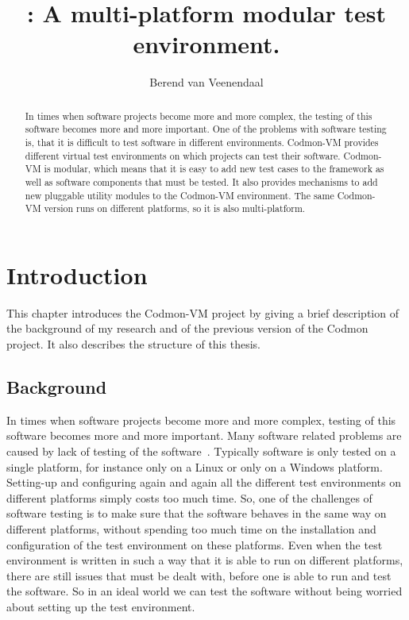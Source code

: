\documentclass{article}
\title{\project{}: A multi-platform modular test environment.}
\author{Berend van Veenendaal}
\newcommand{\project}{Codmon-VM}
\begin{document}
\maketitle

\begin{abstract}
In times when software projects become more and more complex, the testing of this software becomes more and more important. One of the problems with software testing is, that it is difficult to test software in 
different environments. \project{} provides different virtual test environments on which projects can test their software. \project{} is modular, which means that it is easy to add new test cases to the framework 
as well as software components that must be tested. It also provides mechanisms to add new pluggable utility modules to the \project{} environment. The same \project{} version runs on different platforms, so it 
is also multi-platform.
\end{abstract}
\newpage
\tableofcontents
\newpage

\section{Introduction}
\label{sec:Introduction}
This chapter introduces the \project{} project by giving a brief description of the background of my research and of the
previous version of the Codmon project. It also describes the structure of this thesis.

\subsection{Background}
\label{sec:Background}
In times when software projects become more and more complex, testing of this software becomes more and more important. Many software related problems are caused by lack of testing of the 
software~\cite{TTCST}. Typically software is only tested on a single platform, for instance only on a Linux or only on a Windows platform. Setting-up and configuring again and again all 
the different test environments on different platforms simply costs too much time. So, one of the challenges of software testing is to make sure that the software behaves in the same way on 
different platforms, without spending too much time on the installation and configuration of the test environment on these platforms. Even when the test environment is written in such a way 
that it is able to run on different platforms, there are still issues that must be dealt with, before one is able to run and test the software. So in an ideal world we can test the software without being 
worried about setting up the test environment. 
\end{document}
